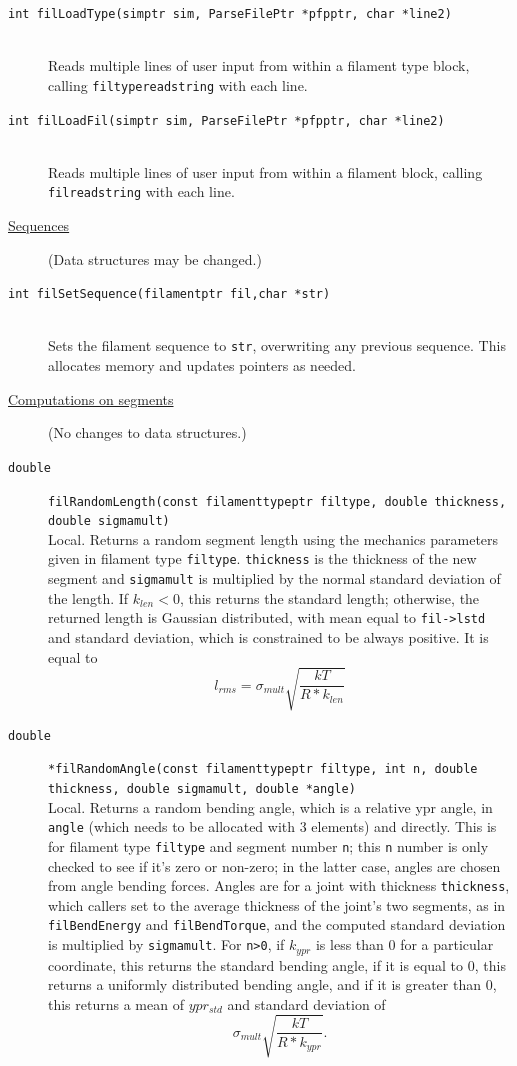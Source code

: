 \documentclass {scrbook}
\newcommand {\ttt} {\texttt}
\begin{document}
\begin{description}
\item[\ttt{int filLoadType(simptr sim, ParseFilePtr *pfpptr, char *line2)}]
\hfill \\
Reads multiple lines of user input from within a filament type block, calling \ttt{filtypereadstring} with each line.

\item[\ttt{int filLoadFil(simptr sim, ParseFilePtr *pfpptr, char *line2)}]
\hfill \\
Reads multiple lines of user input from within a filament block, calling \ttt{filreadstring} with each line.


\item[\underline{Sequences}]
(Data structures may be changed.)

\item[\ttt{int filSetSequence(filamentptr fil,char *str)}]
\hfill \\
Sets the filament sequence to \ttt{str}, overwriting any previous sequence. This allocates memory and updates pointers as needed.


\item[\underline{Computations on segments}]
(No changes to data structures.)

\item[\ttt{double}]
\ttt{filRandomLength(const filamenttypeptr filtype, double thickness, double sigmamult)}
\hfill \\
Local. Returns a random segment length using the mechanics parameters given in filament type \ttt{filtype}. \ttt{thickness} is the thickness of the new segment and \ttt{sigmamult} is multiplied by the normal standard deviation of the length. If $k_{len} < 0$, this returns the standard length; otherwise, the returned length is Gaussian distributed, with mean equal to \ttt{fil->lstd} and standard deviation, which is constrained to be always positive. It is equal to
$$l_{rms} = \sigma_{mult}\sqrt{\frac{kT}{R*k_{len}}}$$

\item[\ttt{double}]
\ttt{*filRandomAngle(const filamenttypeptr filtype, int n, double thickness, double sigmamult, double *angle)}
\hfill \\
Local. Returns a random bending angle, which is a relative ypr angle, in \ttt{angle} (which needs to be allocated with 3 elements) and directly. This is for filament type \ttt{filtype} and segment number \ttt{n}; this \ttt{n} number is only checked to see if it's zero or non-zero; in the latter case, angles are chosen from angle bending forces. Angles are for a joint with thickness \ttt{thickness}, which callers set to the average thickness of the joint's two segments, as in \ttt{filBendEnergy} and \ttt{filBendTorque}, and the computed standard deviation is multiplied by \ttt{sigmamult}. For \ttt{n>0}, if $k_{ypr}$ is less than 0 for a particular coordinate, this returns the standard bending angle, if it is equal to 0, this returns a uniformly distributed bending angle, and if it is greater than 0, this returns a mean of $ypr_{std}$ and standard deviation of
$$\sigma_{mult} \sqrt{\frac{kT}{R*k_{ypr}}}.$$


\end{description}
\end{document}
